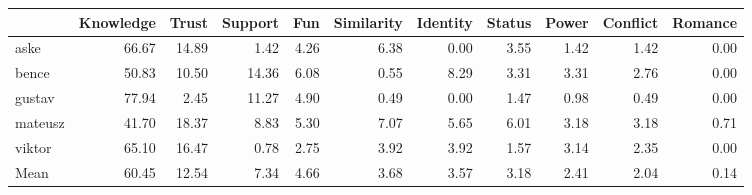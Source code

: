 \begin{tabular}{lrrrrrrrrrr}
\toprule
{} &  Knowledge &  Trust &  Support &   Fun &  Similarity &  Identity &  Status &  Power &  Conflict &  Romance \\
\midrule
aske    &      66.67 &  14.89 &     1.42 &  4.26 &        6.38 &      0.00 &    3.55 &   1.42 &      1.42 &     0.00 \\
bence   &      50.83 &  10.50 &    14.36 &  6.08 &        0.55 &      8.29 &    3.31 &   3.31 &      2.76 &     0.00 \\
gustav  &      77.94 &   2.45 &    11.27 &  4.90 &        0.49 &      0.00 &    1.47 &   0.98 &      0.49 &     0.00 \\
mateusz &      41.70 &  18.37 &     8.83 &  5.30 &        7.07 &      5.65 &    6.01 &   3.18 &      3.18 &     0.71 \\
viktor  &      65.10 &  16.47 &     0.78 &  2.75 &        3.92 &      3.92 &    1.57 &   3.14 &      2.35 &     0.00 \\
Mean    &      60.45 &  12.54 &     7.34 &  4.66 &        3.68 &      3.57 &    3.18 &   2.41 &      2.04 &     0.14 \\
\bottomrule
\end{tabular}

